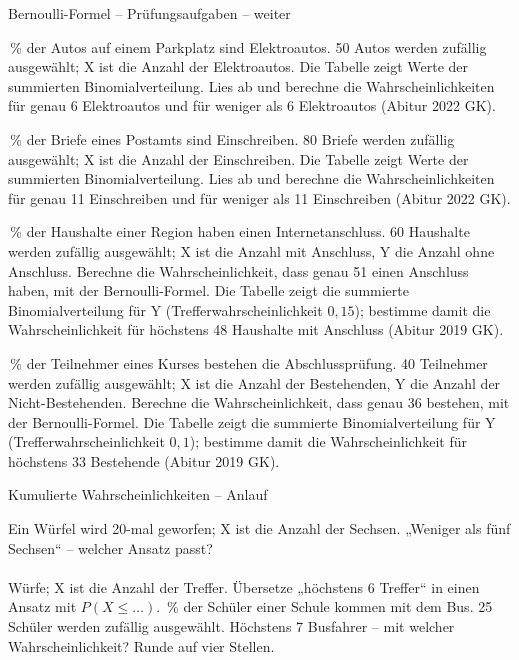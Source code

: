 \begin{aufgabe}{Bernoulli-Formel – Prüfungsaufgaben – weiter}
\begin{teile}
\,\% der Autos auf einem Parkplatz sind Elektroautos. 50 Autos werden zufällig ausgewählt; X ist die Anzahl der Elektroautos. Die Tabelle zeigt Werte der summierten Binomialverteilung. Lies ab und berechne die Wahrscheinlichkeiten für genau 6 Elektroautos und für weniger als 6 Elektroautos \hfill (Abitur 2022 GK).

\,\% der Briefe eines Postamts sind Einschreiben. 80 Briefe werden zufällig ausgewählt; X ist die Anzahl der Einschreiben. Die Tabelle zeigt Werte der summierten Binomialverteilung. Lies ab und berechne die Wahrscheinlichkeiten für genau 11 Einschreiben und für weniger als 11 Einschreiben \hfill (Abitur 2022 GK).

\,\% der Haushalte einer Region haben einen Internetanschluss. 60 Haushalte werden zufällig ausgewählt; X ist die Anzahl mit Anschluss, Y die Anzahl ohne Anschluss. Berechne die Wahrscheinlichkeit, dass genau 51 einen Anschluss haben, mit der Bernoulli-Formel. Die Tabelle zeigt die summierte Binomialverteilung für Y (Trefferwahrscheinlichkeit $0{,}15$); bestimme damit die Wahrscheinlichkeit für höchstens 48 Haushalte mit Anschluss \hfill (Abitur 2019 GK).

\,\% der Teilnehmer eines Kurses bestehen die Abschlussprüfung. 40 Teilnehmer werden zufällig ausgewählt; X ist die Anzahl der Bestehenden, Y die Anzahl der Nicht-Bestehenden. Berechne die Wahrscheinlichkeit, dass genau 36 bestehen, mit der Bernoulli-Formel. Die Tabelle zeigt die summierte Binomialverteilung für Y (Trefferwahrscheinlichkeit $0{,}1$); bestimme damit die Wahrscheinlichkeit für höchstens 33 Bestehende \hfill (Abitur 2019 GK).

\end{teile}
\end{aufgabe}

\begin{aufgabe}{Kumulierte Wahrscheinlichkeiten – Anlauf}
\begin{teile}
\teil Ein Würfel wird 20-mal geworfen; X ist die Anzahl der Sechsen. „Weniger als fünf Sechsen“ – welcher Ansatz passt?  \\  \\ 
 Würfe; X ist die Anzahl der Treffer. Übersetze „höchstens 6 Treffer“ in einen Ansatz mit $P(X \le \ldots)$.
\,\% der Schüler einer Schule kommen mit dem Bus. 25 Schüler werden zufällig ausgewählt. Höchstens 7 Busfahrer – mit welcher Wahrscheinlichkeit? Runde auf vier Stellen. \leerfeld
\end{teile}
\end{aufgabe}

